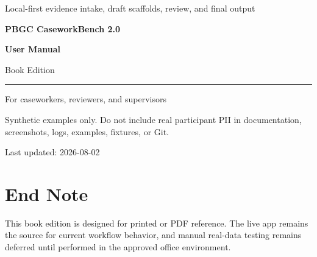 \documentclass[11pt,twoside,openany]{book}
\begin{document}
\sloppy

\begin{titlepage}
\pagecolor{softgray}
\centering
\vspace*{0.8in}
{\sffamily\Large\color{teal}Local-first evidence intake, draft scaffolds, review, and final output}\par
\vspace{0.35in}
{\sffamily\Huge\bfseries\color{deepblue}PBGC CaseworkBench 2.0}\par
\vspace{0.2in}
{\sffamily\Huge\bfseries\color{ink}User Manual}\par
\vspace{0.35in}
{\Large Book Edition}\par
\vspace{0.75in}
\rule{0.72\textwidth}{1.2pt}\par
\vspace{0.35in}
{\large For caseworkers, reviewers, and supervisors}\par
\vfill
{\small Synthetic examples only. Do not include real participant PII in documentation, screenshots, logs, examples, fixtures, or Git.}\par
\vspace{0.2in}
{\small Last updated: 2026-08-02}\par
\end{titlepage}
\nopagecolor

\frontmatter
\tableofcontents
\mainmatter



\backmatter
\chapter*{End Note}
This book edition is designed for printed or PDF reference. The live app remains the source for current workflow behavior, and manual real-data testing remains deferred until performed in the approved office environment.
\end{document}
